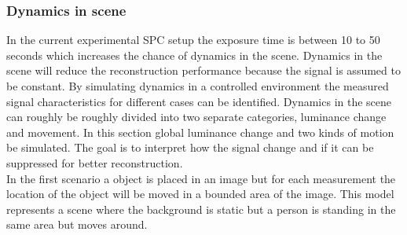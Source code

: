 \subsubsection{Dynamics in scene}
In the current experimental SPC setup the exposure time is between 10 to 50 seconds which increases the chance of dynamics in the scene. Dynamics in the scene will reduce the reconstruction performance because the signal is assumed to be constant. By simulating dynamics in a controlled environment the measured signal characteristics for different cases can be identified. Dynamics in the scene can roughly be roughly divided into two separate categories, luminance change and movement. In this section global luminance change and two kinds of motion be simulated. The goal is to interpret how the signal change and if it can be suppressed for better reconstruction.\\[0.1in]




In the first scenario a object is placed in an image but for each measurement the location of the object will be moved in a bounded area of the image. This model represents a scene where the background is static but a person is standing in the same area but moves around.



